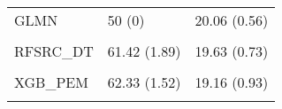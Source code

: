 \begin{longtable}[t]{lll}
\hspace{1em}GLMN & 50 (0) & 20.06 (0.56)\\
\hspace{1em}\cellcolor{gray!10}{RFSRC} & \cellcolor{gray!10}{63.61 (1.57)} & \cellcolor{gray!10}{19.07 (0.5)}\\
\hspace{1em}RFSRC\_DT & 61.42 (1.89) & 19.63 (0.73)\\
\hspace{1em}\cellcolor{gray!10}{XGBCox} & \cellcolor{gray!10}{60.05 (3.58)} & \cellcolor{gray!10}{20.43 (1.44)}\\
\hspace{1em}XGB\_PEM & 62.33 (1.52) & 19.16 (0.93)\\
\hspace{1em}\cellcolor{gray!10}{XGB\_DT} & \cellcolor{gray!10}{61.17 (2.79)} & \cellcolor{gray!10}{19.2 (0.85)}\\*
\end{longtable}
